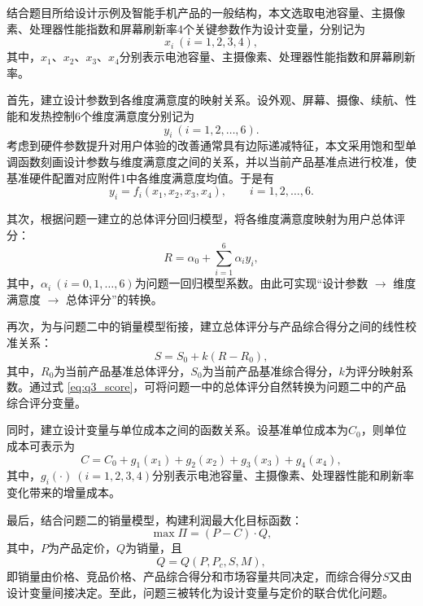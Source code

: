 \documentclass[withoutpreface,bwprint]{cumcmthesis} %
\begin{document}
结合题目所给设计示例及智能手机产品的一般结构，本文选取电池容量、主摄像素、处理器性能指数和屏幕刷新率4个关键参数作为设计变量，分别记为
\[
x_i\ (i=1,2,3,4),
\]
其中，$x_1$、$x_2$、$x_3$、$x_4$分别表示电池容量、主摄像素、处理器性能指数和屏幕刷新率。

首先，建立设计参数到各维度满意度的映射关系。设外观、屏幕、摄像、续航、性能和发热控制6个维度满意度分别记为
\[
y_i\ (i=1,2,\dots,6).
\]
考虑到硬件参数提升对用户体验的改善通常具有边际递减特征，本文采用饱和型单调函数刻画设计参数与维度满意度之间的关系，并以当前产品基准点进行校准，使基准硬件配置对应附件1中各维度满意度均值。于是有
\begin{equation}
y_i=f_i(x_1,x_2,x_3,x_4),\qquad i=1,2,\dots,6.
\label{eq:q3_dim_map}
\end{equation}

其次，根据问题一建立的总体评分回归模型，将各维度满意度映射为用户总体评分：
\begin{equation}
R=\alpha_0+\sum_{i=1}^{6}\alpha_i y_i,
\label{eq:q3_rating}
\end{equation}
其中，$\alpha_i\ (i=0,1,\dots,6)$为问题一回归模型系数。由此可实现“设计参数 $\rightarrow$ 维度满意度 $\rightarrow$ 总体评分”的转换。

再次，为与问题二中的销量模型衔接，建立总体评分与产品综合得分之间的线性校准关系：
\begin{equation}
S=S_0+k(R-R_0),
\label{eq:q3_score}
\end{equation}
其中，$R_0$为当前产品基准总体评分，$S_0$为当前产品基准综合得分，$k$为评分映射系数。通过式 \eqref{eq:q3_score}，可将问题一中的总体评分自然转换为问题二中的产品综合评分变量。

同时，建立设计变量与单位成本之间的函数关系。设基准单位成本为$C_0$，则单位成本可表示为
\begin{equation}
C=C_0+g_1(x_1)+g_2(x_2)+g_3(x_3)+g_4(x_4),
\label{eq:q3_cost}
\end{equation}
其中，$g_i(\cdot)\ (i=1,2,3,4)$分别表示电池容量、主摄像素、处理器性能和刷新率变化带来的增量成本。

最后，结合问题二的销量模型，构建利润最大化目标函数：
\begin{equation}
\max \Pi=(P-C)\cdot Q,
\label{eq:q3_profit}
\end{equation}
其中，$P$为产品定价，$Q$为销量，且
\begin{equation}
Q=Q(P,P_c,S,M),
\label{eq:q3_sales}
\end{equation}
即销量由价格、竞品价格、产品综合得分和市场容量共同决定，而综合得分$S$又由设计变量间接决定。至此，问题三被转化为设计变量与定价的联合优化问题。
\end{document}
